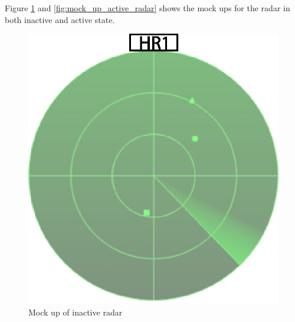Figure \ref{fig:mock_up_inactive_radar} and \ref{fig:mock_up_active_radar} shows the mock ups for the radar in both inactive and active state.
\begin{figure}[htbp]
  \begin{minipage}[b]{0.5\linewidth}
    \centering
    \includegraphics[width=\linewidth]{figure/radar1.eps}
    \caption{Mock up of inactive radar}
    \label{fig:mock_up_inactive_radar}
  \end{minipage}
  \hspace{0.5cm}
  \begin{minipage}[b]{0.5\linewidth}
    \centering

\end{minipage}
\end{figure}
